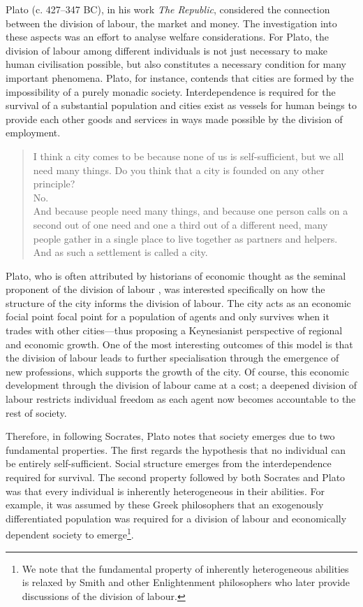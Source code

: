 Plato (c. 427--347 BC), in his work \textit{The Republic}, considered the connection between the division of labour, the market and money. The investigation into these aspects was an effort to analyse welfare considerations. For Plato, the division of labour among different individuals is not just necessary to make human civilisation possible, but also constitutes a necessary condition for many important phenomena. Plato, for instance, contends that cities are formed by the impossibility of a purely monadic society. Interdependence is required for the survival of a substantial population and cities exist as vessels for human beings to provide each other goods and services in ways made possible by the division of employment.

\begin{quote}
I think a city comes to be because none of us is self-sufficient, but we all need many things. Do you think that a city is founded on any other principle?
\\
No.
\\
And because people need many things, and because one person calls on a second out of one need and one a third out of a different need, many people gather in a single place to live together as partners and helpers. And as such a settlement is called a city.

\begin{flushright}
\citet[p.~151]{Plato2007}
\end{flushright}
\end{quote}

Plato, who is often attributed by historians of economic thought as the seminal proponent of the division of labour \citep{Silvermintz2010}, was interested specifically on how the structure of the city informs the division of labour. The city acts as an economic focial point focal point for a population of agents and only survives when it trades with other cities---thus proposing a Keynesianist perspective of regional and economic growth. One of the most interesting outcomes of this model is that the division of labour leads to further specialisation through the emergence of new professions, which supports the growth of the city. Of course, this economic development through the division of labour came at a cost; a deepened division of labour restricts individual freedom as each agent now becomes accountable to the rest of society.

Therefore, in following Socrates, Plato notes that society emerges due to two fundamental properties. The first regards the hypothesis that no individual can be entirely self-sufficient. Social structure emerges from the interdependence required for survival. The second property followed by both Socrates and Plato was that every individual is inherently heterogeneous in their abilities. For example, it was assumed by these Greek philosophers that an exogenously differentiated population was required for a division of labour and economically dependent society to emerge\footnote{We note that the fundamental property of inherently heterogeneous abilities is relaxed by Smith and other Enlightenment philosophers who later provide discussions of the division of labour.}.

